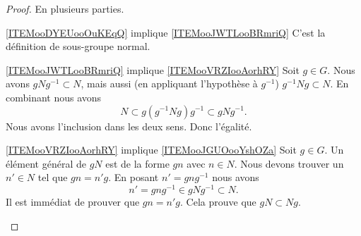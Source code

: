\begin{proof}
	En plusieurs parties.
	\begin{subproof}
		\item[\ref{ITEMooDYEUooOuKEqQ} implique \ref{ITEMooJWTLooBRmriQ}]
		C'est la définition de sous-groupe normal.
		\item[\ref{ITEMooJWTLooBRmriQ} implique \ref{ITEMooVRZIooAorhRY}]
		Soit \( g\in G\). Nous avons \( gNg^{-1}\subset N\), mais aussi (en appliquant l'hypothèse à \( g^{-1}\)) \( g^{-1}Ng\subset N\). En combinant nous avons
		\begin{equation}
			N\subset g(g^{-1} Ng)g^{-1}\subset g Ng^{-1}.
		\end{equation}
		Nous avons l'inclusion dans les deux sens. Donc l'égalité.
		\item[\ref{ITEMooVRZIooAorhRY} implique \ref{ITEMooJGUOooYshOZa}]
		Soit \( g\in G\). Un élément général de \( gN\) est de la forme \( gn\) avec \( n\in N\). Nous devons trouver un \( n'\in N\) tel que \( gn=n'g\). En posant \( n'=gng^{-1}\) nous avons
		\begin{equation}
			n'=gng^{-1}\in gNg^{-1}\subset N.
		\end{equation}
		Il est immédiat de prouver que \( gn=n'g\). Cela prouve que \( gN\subset Ng\).


\end{subproof}
\end{proof}
